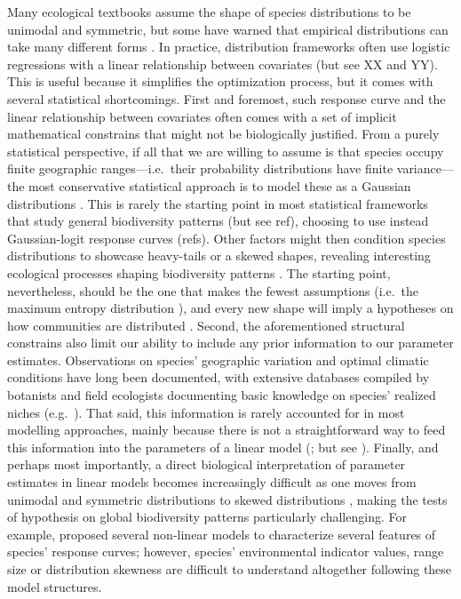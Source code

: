 \documentclass[11pt, a4paper]{article}
\begin{document}
Many ecological textbooks \citep{krebsEcologyExperimentalAnalysis1972} assume the shape of species distributions to be unimodal and symmetric, but some have warned that empirical distributions can take many different forms \citep{austinModelsAnalysisSpecies1987, austin2002spatial}. In practice, distribution frameworks often use logistic regressions with a linear relationship between covariates (but see XX and YY). This is useful because it simplifies the optimization process, but it comes with several statistical shortcomings. First and foremost, such response curve and the linear relationship between covariates often comes with a set of implicit mathematical constrains that might not be biologically justified. From a purely statistical perspective, if all that we are willing to assume is that species occupy finite geographic ranges---i.e.~their probability distributions have finite variance---the most conservative statistical approach is to model these as a Gaussian distributions \citep{frankCommonPatternsNature2009}. This is rarely the starting point in most statistical frameworks that study general biodiversity patterns (but see ref), choosing to use instead Gaussian-logit response curves (refs). Other factors might then condition species distributions to showcase heavy-tails or a skewed shapes, revealing interesting ecological processes shaping biodiversity patterns \citep{austinNonlinearSpeciesResponse1976, minchinEvaluationRelativeRobustness1987}. The starting point, nevertheless, should be the one that makes the fewest assumptions (i.e.~the maximum entropy distribution \citealt{entropy stuff}), and every new shape will imply a hypotheses on how communities are distributed \citep{damenSpatialPredictionsCommunity2017}. Second, the aforementioned structural constrains also limit our ability to include any prior information to our parameter estimates. Observations on species' geographic variation and optimal climatic conditions have long been documented, with extensive databases compiled by botanists and field ecologists documenting basic knowledge on species' realized niches (e.g.~\citealt{landoltFloraIndicativaOkologische2010}). That said, this information is rarely accounted for in most modelling approaches, mainly because there is not a straightforward way to feed this information into the parameters of a linear model (\citealt{scherrerEcologicalIndicatorValues2019}; but see \citealt{terbraakWeightedAveragingLogistic1986}). Finally, and perhaps most importantly, a direct biological interpretation of parameter estimates in linear models becomes increasingly difficult as one moves from unimodal and symmetric distributions \citep{jamilGeneralizedLinearMixed2013, terbraakWeightedAveragingLogistic1986} to skewed distributions \citep{huismanHierarchicalSetModels1993}, making the tests of hypothesis on global biodiversity patterns particularly challenging. For example, \citet{huismanHierarchicalSetModels1993} proposed several non-linear models to characterize several features of species' response curves; however, species' environmental indicator values, range size or distribution skewness are difficult to understand altogether following these model structures.
\end{document}
